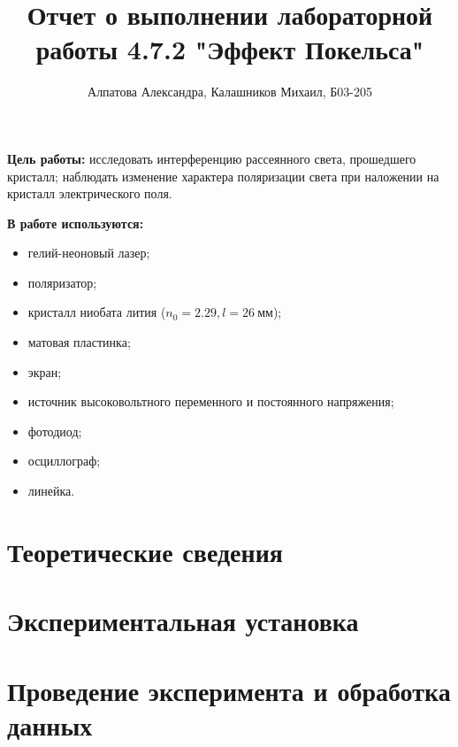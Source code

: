 \documentclass[14pt, a4paper]{report}
\title{\textbf{Отчет о выполнении лабораторной работы 4.7.2 "Эффект Покельса"}}
\author{Алпатова Александра, Калашников Михаил, Б03-205}
\date{}
\begin{document}
\maketitle

\textbf{Цель работы:}
исследовать интерференцию рассеянного света, прошедшего кристалл; наблюдать изменение характера поляризации света при наложении на кристалл электрического поля.
\newline

\textbf{В работе используются:}
\begin{itemize}
\item гелий-неоновый лазер;
\item поляризатор;
\item кристалл ниобата лития ($n_0=2.29, l=26\ мм$);
\item матовая пластинка;
\item экран;
\item источник высоковольтного переменного и постоянного напряжения;
\item фотодиод;
\item осциллограф;
\item линейка.
\end{itemize}

\section{Теоретические сведения}

\section{Экспериментальная установка}

\section{Проведение эксперимента и обработка данных}
\end{document}
